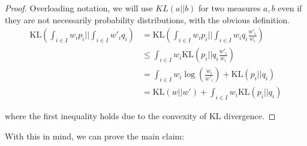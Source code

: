 \begin{proof}  
Overloading notation, we will use $KL (a || b) $ for two measures $a,b$ even if they are not necessarily probability distributions, with the obvious definition.  
\begin{align*} 
\mbox{KL}\left(\int_{i \in I} w_i p_i || \int_{i \in I} w'_i q_i\right) &= \mbox{KL}\left(\int_{i \in I} w_i p_i || \int_{i \in I} w_i q_i \frac{w'_i}{w_i}\right) \\ 
&\leq \int_{i \in I} w_i  \mbox{KL}\left( p_i || q_i \frac{w'_i}{w_i}\right) \\ 
&=\int_{i \in I} w_i \log\left(\frac{w_i}{w'_i}\right) + \mbox{KL}(p_i || q_i) \\ 
&=\mbox{KL}(w || w') + \int_{i \in I} w_i \mbox{KL}(p_i || q_i) \end{align*} 

where the first inequality holds due to the convexity of KL divergence. 

\end{proof} 

With this in mind, we can prove the main claim: 

